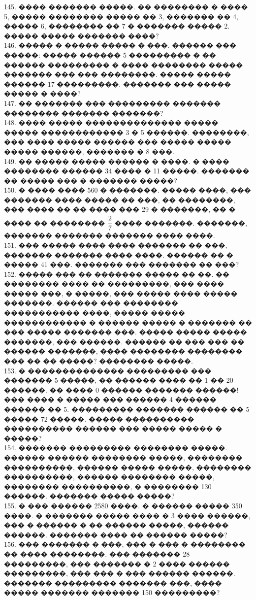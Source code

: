 \documentclass[12pt]{article}
\begin{document}
145. ���� ������� �����. �� �������� � ���� 5, ����� �������� ����� �� 3, ������� �� 4, ����� 6, �������� �� 7 � ������� ����� 2. ����� ����� ������� ����?\\
146. ����� � ����� ����� � ���. ������ ��� �����: ����� ������ 5 ��������� � �� ������ ��������� � ���� �������� ����� ������� ��� ��� ��������. ����� ����� ������ 17 ���������. ������� ��� ����� ����� � ����?\\
147. �� ������� ��� ��������� ������� �������� ������� �������?\\
148. ���� ����� �������������� ����� ����� ������������ 3 � 5 ������.  ��������, ��� ���� ����� ������ ��� ����� ����� ����� ������, ������� � 8 ���.\\
149. �� ����� ����� ������ � ����. � ���� �������� ������ 34 ���� � 11 �����. ������� �� ����� ��� � ������� �����?\\
150. � ���� ���� 560 � �������. ����� ����, ��� ������� ���� ����� �� ���, �� ��������, ��� ���� �� �� ���� ��� 29 � �������, �� � ���� �� �������� $\cfrac{2}{7}$ ���� �������. �������, ������� ������� ������� ���� ����.\\
151. ��� ����� ���� ���� ������� �� ���, ������� ������� ���� ����. ������ �� � ����� 41 ���. ������� ��� ������� �� ���?\\
152. ����� ��� �� ������� �����  �� ��. �� �������� ���� �� ���������, ��� ���� ����� ���, � �����, ��� ����� ���� ����� �������. ������ ��� �������� ����������� ����, ����� ����� ������������ � ������ ����� � ������� �� ��� ����� ������� ���. ����� ����� ����� �������, ��� ������. ������ �� ��� ��� �� ������ �������, ���� �������� �������� ��� �� �� �����? �������� �����.\\
153. � �������������� ��������� ��� ������� 5 �����, �� ������ ���� �� 1 �� 20 ������. �� ���� 0 ������ ������� ������! ��� ���� � ����� ��� ������ 4 ������ ������ �� 5. ��������� ������� ������ �� 5 ����� 72 �����. ����� ���������� ���������� ������ ��� ����� ����� � �����?\\
154. ������� ��������� �������� �����. ������ ������ �������� �����, �������� ����������, ������ ����� �����, �������� ����������, ������ �������� �����, �������� ����������, � �������� 130 ������. ������� ����� �����?\\
155. � ��� ������ 2580 ����. � ������ ����� 350 ����. � ������� ����� ���� � 3 ����  ������, ��� � ������ � �� ������ �����, ������ ������. ������� ���� �� ������ �����?\\
156. ��� ������� � ���, ��� � ��� � �������� �� ���� ��������. ��� ������� 28 ���������, ��� ������� � 2 ���� ������ ���������, ��� ��� � ��� ������ ������. ������� ��������� ������� ���, ���� ����� ������� ������� 150 ���������?\\
\end{document}

